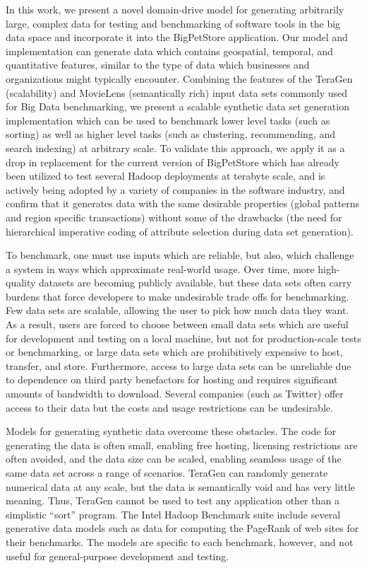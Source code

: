 \documentclass[conference]{IEEEtran}
\begin{document}
In this work, we present a novel domain-drive model for generating arbitrarily large, complex data for testing and benchmarking of software tools in the big data space and incorporate it into the BigPetStore application.   Our model and implementation can generate data which contains geospatial, temporal, and quantitative features, similar to the type of data which businesses and organizations might typically encounter. Combining the features of the TeraGen (scalability) and MovieLens (semantically rich) input data sets commonly used for Big Data benchmarking, we present a scalable synthetic data set generation implementation which can be used to benchmark lower level tasks (such as sorting) as well as higher level tasks (such as clustering, recommending, and search indexing) at arbitrary scale.  To validate this approach, we apply it as a drop in replacement for the current version of BigPetStore which has already been utilized to test several Hadoop deployments at terabyte scale, and is actively being adopted by a variety of companies in the software industry, and confirm that it generates data with the same desirable properties (global patterns and region specific transactions) without some of the drawbacks (the need for hierarchical imperative coding of attribute selection during data set generation).

To benchmark, one must use inputs which are reliable, but also, which challenge a system in ways which approximate real-world usage.  Over time, more high-quality datasets are becoming publicly available, but these data sets often carry burdens that force developers to make undesirable trade offs for benchmarking. Few data sets are scalable, allowing the user to pick how much data they want.  As a result, users are forced to choose between small data sets which are useful for development and testing on a local machine, but not for production-scale tests or benchmarking, or large data sets which are prohibitively expensive to host, transfer, and store. Furthermore, access to large data sets can be unreliable due to dependence on third party benefactors for hosting and requires significant amounts of bandwidth to download.  Several companies (such as Twitter) offer access to their data but the costs and usage restrictions can be undesirable.

Models for generating synthetic data overcome these obstacles.  The code for generating the data is often small, enabling free hosting, licensing restrictions are often avoided, and the data size can be scaled, enabling seamless usage of the same data set across a range of scenarios.  TeraGen can randomly generate numerical data at any scale, but the data is semantically void and has very little meaning.  Thus, TeraGen cannot be used to test any application other than a simplistic “sort” program.  The Intel Hadoop Benchmark suite include several generative data models such as data for computing the PageRank of web sites for their benchmarks. The models are specific to each benchmark, however, and not useful for general-purpose development and testing.
\end{document}
